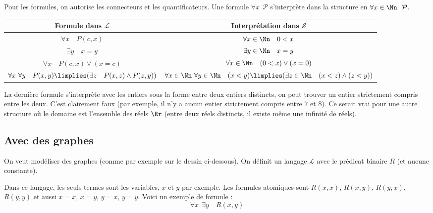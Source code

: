 \documentclass[11pt,class=report,crop=false]{standalone}
\begin{document}
Pour les formules, on autorise les connecteurs et les quantificateurs.
Une formule \og{}$\forall x \ \ \mathcal{P}$\fg{} s'interprète dans la structure en \og{}$\forall x \in \Nn \ \ \mathcal{P}$\fg{}.
\begin{center}
\begin{tabular}{c|c}
Formule dans $\mathcal{L}$ & Interprétation dans $\mathcal{S}$ \\
\hline
$\forall x \quad P(c,x)$ & $\forall x \in \Nn \quad 0 < x$ \\
$\exists y  \quad x=y$  & $\exists y \in \Nn \quad x=y$ \\
$\forall x \quad P(c,x) \lor (x=c)$ 
& $\forall x \in \Nn \quad (0<x) \lor (x=0)$ \\
$\forall x \ \forall y \quad P(x,y) \limplies (\exists z \quad P(x,z) \land P(z,y))$ & $\forall x \in \Nn \ \forall y \in \Nn \quad (x<y) \limplies (\exists z \in \Nn \quad (x<z) \land (z<y))$
\end{tabular}
\end{center}

La dernière formule s'interprète avec les entiers sous la forme \og{}entre deux entiers distincts, on peut trouver un entier strictement compris entre les deux\fg{}. C'est clairement faux (par exemple, il n'y a aucun entier strictement compris entre $7$ et $8$). Ce serait vrai pour une autre structure où le domaine est l'ensemble des réels $\Rr$ (entre deux réels distincts, il existe même une infinité de réels).
 
 
 
\subsection{Avec des graphes}


On veut modéliser des graphes (comme par exemple sur le dessin ci-dessous).
On définit un langage $\mathcal{L}$ avec le prédicat binaire $R$ (et aucune constante).

Dans ce langage, les seuls termes sont les variables, $x$ et $y$ par exemple.
Les formules atomiques sont $R(x,x)$, $R(x,y)$, $R(y,x)$, $R(y,y)$ et aussi $x=x$, $x=y$, $y=x$, $y=y$.
Voici un exemple de formule :
\[
\forall x \ \  \exists y \quad R(x,y)
\]
\end{document}
